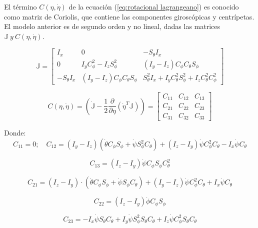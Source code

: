 \documentclass[\main/main.tex]{subfiles}
\begin{document}
El término $C(\eta,\dot{\eta})$ de la ecuación (\ref{eq:rotacional lagrangeano})
es conocido como matriz de Coriolis, que contiene las componentes
giroscópicas y centrípetas. El modelo anterior es de segundo orden
y no lineal, dadas las matrices $\mathbb{J}\ y\ C(\eta,\dot{\eta})$.

\begin{equation}
\mathbb{J}=\begin{bmatrix}I_{x} & 0 & -S_{\theta}I_{x}\\
0 & I_{y}C_{\phi}^{2}-I_{z}S_{\phi}^{2} & (I_{y}-I_{z})C_{\phi}C_{\theta}S_{\phi}\\
-S_{\theta}I_{x} & (I_{y}-I_{z})C_{\phi}C_{\theta}S_{\phi} & S_{\theta}^{2}I_{x}+I_{y}C_{\theta}^{2}S_{\phi}^{2}+I_{z}C_{\theta}^{2}C_{\phi}^{2}
\end{bmatrix}
\end{equation}

\begin{equation}
C(\eta,\dot{\eta})=(\dot{\mathbb{J}}-\frac{1}{2}\frac{\partial}{\partial\eta}(\dot{\eta}^{T}\mathbb{J}))=\begin{bmatrix}C_{11} & C_{12} & C_{13}\\
C_{21} & C_{22} & C_{23}\\
C_{31} & C_{32} & C_{33}
\end{bmatrix}
\end{equation}

Donde:
\begin{equation}
C_{11}=0;\quad C_{12}=(I_{y}-I_{z})(\dot{\theta}C_{\phi}S_{\phi}+\dot{\psi}S_{\phi}^{2}C_{\theta})+(I_{z}-I_{y})\dot{\psi}C_{\phi}^{2}C_{\theta}-I_{x}\dot{\psi}C_{\theta}
\end{equation}

\begin{equation}
C_{13}=(I_{z}-I_{y})\dot{\psi}C_{\phi}S_{\phi}C_{\theta}^{2}
\end{equation}

\begin{equation}
C_{21}=(I_{z}-I_{y})\cdot(\dot{\theta}C_{\phi}S_{\phi}+\dot{\psi}S_{\phi}C_{\theta})+(I_{y}-I_{z})\dot{\psi}C_{\phi}^{2}C_{\theta}+I_{x}\dot{\psi}C_{\theta}
\end{equation}

\begin{equation}
C_{22}=(I_{z}-I_{y})\dot{\phi}C_{\phi}S_{\phi}
\end{equation}

\begin{equation}
C_{23}=-I_{x}\dot{\psi}S_{\theta}C_{\theta}+I_{y}\dot{\psi}S_{\phi}^{2}S_{\theta}C_{\theta}+I_{z}\dot{\psi}C_{\phi}^{2}S_{\theta}C_{\theta}
\end{equation}
\end{document}
